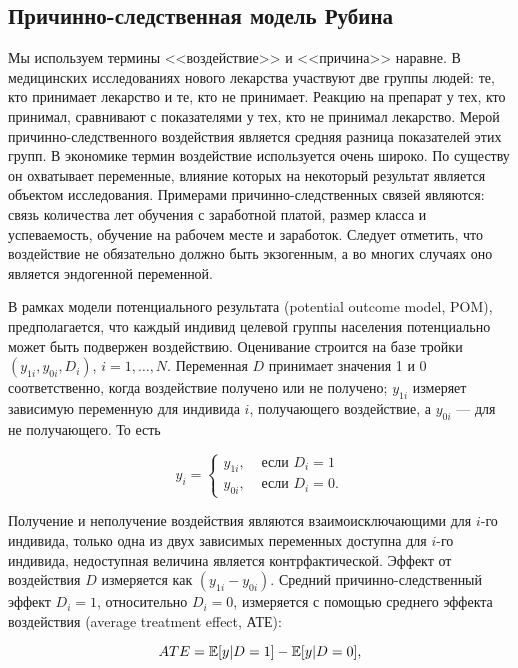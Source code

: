 \subsection{Причинно-следственная модель Рубина}



Мы используем термины <<воздействие>> и <<причина>> наравне. В медицинских исследованиях нового лекарства участвуют две группы людей: те, кто принимает лекарство и те, кто не принимает. Реакцию на препарат у тех, кто принимал, сравнивают с показателями у тех, кто не принимал лекарство. Мерой причинно-следственного воздействия является средняя разница показателей этих групп. В экономике термин воздействие используется очень широко. По существу он охватывает переменные, влияние которых на некоторый результат является объектом исследования. Примерами причинно-следственных связей являются: связь количества лет обучения с заработной платой, размер класса и успеваемость, обучение на рабочем месте и заработок. Следует отметить, что воздействие не обязательно должно быть экзогенным, а во многих случаях оно является эндогенной переменной.


В рамках  модели потенциального результата (potential outcome model, POM),  предполагается, что каждый индивид целевой группы населения потенциально может быть подвержен воздействию. Оценивание строится на базе тройки $(y_{1i},y_{0i},D_{i})$, $i=1,\dots,N$. Переменная $D$ принимает значения 1 и 0 соответственно, когда воздействие получено или не получено; $y_{1i}$ измеряет зависимую переменную для индивида $i$, получающего воздействие, а $y_{0i}$ --- для не получающего. То есть


\begin{equation}
y_{i}=
\begin{cases}
y_{1i}, & \text{ если }D_{i}=1 \\
y_{0i}, &  \text{ если }D_{i}=0.
\end{cases}
\end{equation}

Получение и неполучение воздействия являются взаимоисключающими для $i$-го индивида, только одна из двух зависимых переменных доступна для $i$-го индивида, недоступная величина является контрфактической. Эффект от воздействия $D$ измеряется как $(y_{1i}-y_{0i})$. Средний причинно-следственный эффект $D_{i}=1$, относительно $D_{i}=0$, измеряется с помощью среднего эффекта воздействия (average treatment effect, АТЕ):

\begin{equation}
ATE=\mathbb{E}[y|D=1]-\mathbb{E}[y|D=0],
\end{equation}

